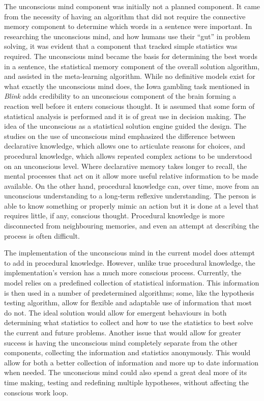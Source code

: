 The unconscious mind component was initially not a planned component.  It came
from the necessity of having an algorithm that did not require the connective
memory component to determine which words in a sentence were important. In
researching the unconscious mind, and how humans use their ``gut'' in problem
solving, it was evident that a component that tracked simple statistics was
required. The unconscious mind became the basis for determining the best words
in a sentence, the statistical memory component of the overall solution
algorithm, and assisted in the meta-learning algorithm.  While no definitive
models exist for what exactly the unconscious mind does, the Iowa gambling task
\cite{Bechara1, Bechara2} mentioned in {\it Blink} \cite{BLINK} adds credibility to an
unconscious component of the brain forming a reaction well before it enters
conscious thought. It is assumed that some form of statistical analysis is
performed and it is of great use in decision making.  The idea of the
unconscious as a statistical solution engine guided the design.  The studies on
the use of unconscious mind emphasized the difference between declarative
knowledge, which allows one to articulate reasons for choices, and procedural
knowledge, which allows repeated complex actions to be understood on an
unconscious level.  Where declarative memory takes longer to recall, the mental
processes that act on it allow more useful relative information to be made
available.  On the other hand, procedural knowledge can, over time, move from an 
unconscious understanding to a long-term reflexive understanding.  The person
is able to know something or properly mimic an action but it is done at a level
that requires little, if any, conscious thought.  Procedural knowledge is more
disconnected from neighbouring memories, and even an attempt at describing the
process is often difficult.

The implementation of the unconscious mind in the current model does attempt to
add in procedural knowledge.  However, unlike true procedural knowledge, the
implementation's version has a much more conscious process.  Currently, the model
relies on a predefined collection of statistical information.  This information is
then used in a number of predetermined algorithms; some, like the hypothesis
testing algorithm, allow for flexible and adaptable use of information that most do
not.  The ideal solution would allow for emergent behaviours in both determining
what statistics to collect and how to use the statistics to best solve the
current and future problems.  Another issue that would allow for greater success
is having the unconscious mind completely separate from the other components,
collecting the information and statistics anonymously. This would allow for both
a better collection of information and more up to date information when needed.
The unconscious mind could also spend a great deal more of its time making,
testing and redefining multiple hypotheses, without affecting the conscious work
loop.


